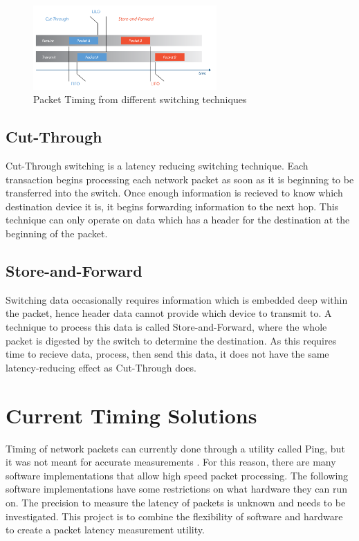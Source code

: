 \begin{figure}[H]
    \begin{center}
        \includegraphics[width=7cm,keepaspectratio]{Images/SwitchingTechniques.png}
        \caption{Packet Timing from different switching techniques \cite{latencyinethernet}}
        \label{fig:PacketTiming}
    \end{center}
\end{figure}

\subsection{Cut-Through}

\par Cut-Through switching is a latency reducing switching technique. 
Each transaction begins processing each network packet as soon as it is beginning to be transferred into the switch.
Once enough information is recieved to know which destination device it is, it begins forwarding information to the next hop.
This technique can only operate on data which has a header for the destination at the beginning of the packet.

\subsection{Store-and-Forward}

\par Switching data occasionally requires information which is embedded deep within the packet, hence header data cannot provide which device to transmit to.
A technique to process this data is called Store-and-Forward, where the whole packet is digested by the switch to determine the destination.
As this requires time to recieve data, process, then send this data, it does not have the same latency-reducing effect as Cut-Through does.

\section{Current Timing Solutions}

\par Timing of network packets can currently done through a utility called Ping, but it was not meant for accurate measurements \cite{pingisbad}.
For this reason, there are many software implementations that allow high speed packet processing.
The following software implementations have some restrictions on what hardware they can run on.
The precision to measure the latency of packets is unknown and needs to be investigated.
This project is to combine the flexibility of software and hardware to create a packet latency measurement utility.

